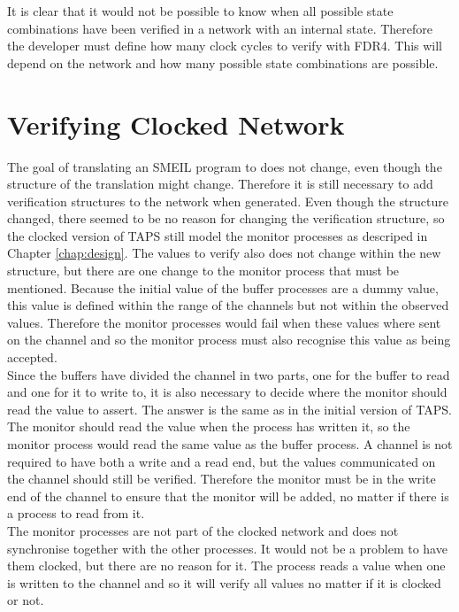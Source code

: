 It is clear that it would not be possible to know when all possible state combinations have been verified in a network with an internal state. Therefore the developer must define how many clock cycles to verify with FDR4. This will depend on the network and how many possible state combinations are possible.
\section{Verifying Clocked Network}
The goal of translating an SMEIL program to \cspm{} does not change, even though the structure of the translation might change. Therefore it is still necessary to add verification structures to the \cspm{} network when generated. Even though the structure changed, there seemed to be no reason for changing the verification structure, so the clocked version of TAPS still model the monitor processes as descriped in Chapter \ref{chap:design}. The values to verify also does not change within the new structure, but there are one change to the monitor process that must be mentioned. Because the initial value of the buffer processes are a dummy value, this value is defined within the range of the channels but not within the observed values. Therefore the monitor processes would fail when these values where sent on the channel and so the monitor process must also recognise this value as being accepted. \\

Since the buffers have divided the channel in two parts, one for the buffer to read and one for it to write to, it is also necessary to decide where the monitor should read the value to assert. The answer is the same as in the initial version of TAPS. The monitor should read the value when the process has written it, so the monitor process would read the same value as the buffer process. A channel is not required to have both a write and a read end, but the values communicated on the channel should still be verified. Therefore the monitor must be in the write end of the channel to ensure that the monitor will be added, no matter if there is a process to read from it. \\

The monitor processes are not part of the clocked network and does not synchronise together with the other processes. It would not be a problem to have them clocked, but there are no reason for it. The process reads a value when one is written to the channel and so it will verify all values no matter if it is clocked or not.\\


